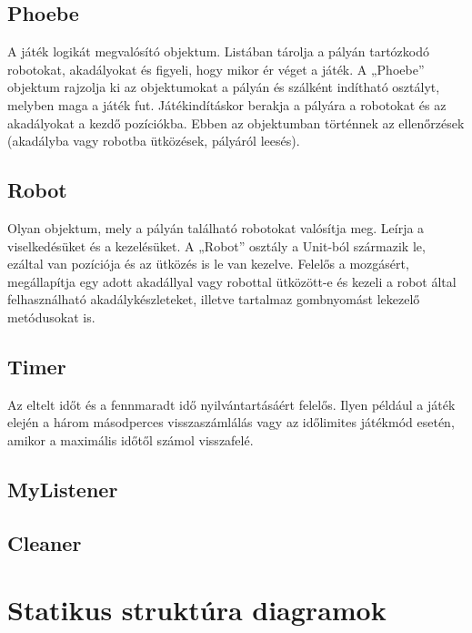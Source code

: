 \subsection{Phoebe}
A játék logikát megvalósító objektum. Listában tárolja a pályán tartózkodó robotokat, akadályokat és figyeli, hogy mikor ér véget a játék. A „Phoebe” objektum rajzolja ki az objektumokat a pályán és szálként indítható osztályt, melyben maga a játék fut. Játékindításkor berakja a pályára a robotokat és az akadályokat a kezdő pozíciókba. Ebben az objektumban történnek az ellenőrzések (akadályba vagy robotba ütközések, pályáról leesés).
\subsection{Robot}
Olyan objektum, mely a pályán található robotokat valósítja meg. Leírja a viselkedésüket és a kezelésüket. A „Robot” osztály a Unit-ból származik le, ezáltal van pozíciója és az ütközés is le van kezelve. Felelős a mozgásért, megállapítja egy adott akadállyal vagy robottal ütközött-e és kezeli a robot által felhasználható akadálykészleteket, illetve tartalmaz gombnyomást lekezelő metódusokat is.
\subsection{Timer}
Az eltelt időt és a fennmaradt idő nyilvántartásáért felelős. Ilyen például a játék elején a három másodperces visszaszámlálás vagy az időlimites játékmód esetén, amikor a maximális időtől számol visszafelé.

\subsection{MyListener}
\subsection{Cleaner}

\section{Statikus struktúra diagramok}

